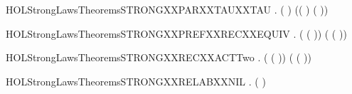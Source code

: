 \newcommand{\HOLStrongLawsTheoremsSTRONGXXPARXXTAUXXPREF}{\UseVerbatim{HOLStrongLawsTheoremsSTRONGXXPARXXTAUXXPREF}}
\begin{SaveVerbatim}{HOLStrongLawsTheoremsSTRONGXXPARXXTAUXXTAU}
\HOLTokenTurnstile{} \HOLSymConst{\HOLTokenForall{}} .
        (\HOLConst{\ensuremath{\tau}} \HOLSymConst{\ensuremath{\parallel}} \HOLConst{\ensuremath{\tau}})
         (\HOLConst{\ensuremath{\tau}}( \HOLSymConst{\ensuremath{\parallel}} \HOLConst{\ensuremath{\tau}}) \HOLSymConst{\ensuremath{+}} \HOLConst{\ensuremath{\tau}}(\HOLConst{\ensuremath{\tau}} \HOLSymConst{\ensuremath{\parallel}} ))
\end{SaveVerbatim}
\newcommand{\HOLStrongLawsTheoremsSTRONGXXPARXXTAUXXTAU}{\UseVerbatim{HOLStrongLawsTheoremsSTRONGXXPARXXTAUXXTAU}}
\begin{SaveVerbatim}{HOLStrongLawsTheoremsSTRONGXXPREFXXRECXXEQUIV}
\HOLTokenTurnstile{} \HOLSymConst{\HOLTokenForall{}}  .
        (  ( ))
         (  ( ))
\end{SaveVerbatim}
\newcommand{\HOLStrongLawsTheoremsSTRONGXXPREFXXRECXXEQUIV}{\UseVerbatim{HOLStrongLawsTheoremsSTRONGXXPREFXXRECXXEQUIV}}
\begin{SaveVerbatim}{HOLStrongLawsTheoremsSTRONGXXRECXXACTTwo}
\HOLTokenTurnstile{} \HOLSymConst{\HOLTokenForall{}} .  (  ( )) (  ( ))
\end{SaveVerbatim}
\newcommand{\HOLStrongLawsTheoremsSTRONGXXRECXXACTTwo}{\UseVerbatim{HOLStrongLawsTheoremsSTRONGXXRECXXACTTwo}}
\begin{SaveVerbatim}{HOLStrongLawsTheoremsSTRONGXXRELABXXNIL}
\HOLTokenTurnstile{} \HOLSymConst{\HOLTokenForall{}}.  (  ) 
\end{SaveVerbatim}

